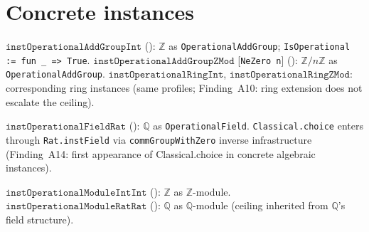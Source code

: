 \section{Concrete instances}
\label{sec:algebra_instances}

\begin{definition}
\label{def:int_zmod_instances}
\leanok
{}
$\texttt{instOperationalAddGroupInt}$ (\axiomprofile{[propext]}):
$\mathbb{Z}$ as \texttt{OperationalAddGroup}; \texttt{IsOperational := fun \_ => True}.
$\texttt{instOperationalAddGroupZMod}$ [\texttt{NeZero n}]
():
$\mathbb{Z}/n\mathbb{Z}$ as \texttt{OperationalAddGroup}.
$\texttt{instOperationalRingInt}$, $\texttt{instOperationalRingZMod}$:
corresponding ring instances (same profiles; Finding~A10: ring extension
does not escalate the ceiling).
\end{definition}

\begin{definition}
\label{def:rat_instance}
\leanok
{}
$\texttt{instOperationalFieldRat}$
():
$\mathbb{Q}$ as \texttt{OperationalField}.
\texttt{Classical.choice} enters through \texttt{Rat.instField} via
\texttt{commGroupWithZero} inverse infrastructure (Finding~A14:
first appearance of Classical.choice in concrete algebraic instances).
\end{definition}

\begin{definition}
\label{def:module_instances}
\leanok
{}
$\texttt{instOperationalModuleIntInt}$ (\axiomprofile{[propext]}):
$\mathbb{Z}$ as $\mathbb{Z}$-module.
$\texttt{instOperationalModuleRatRat}$
():
$\mathbb{Q}$ as $\mathbb{Q}$-module (ceiling inherited from $\mathbb{Q}$'s field structure).
\end{definition}

